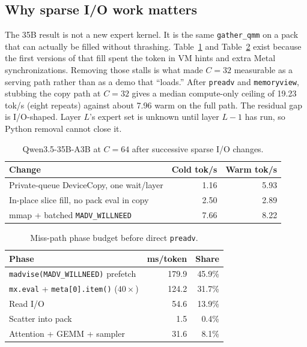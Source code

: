\documentclass[11pt]{article}
\theoremstyle{definition}
\begin{document}
\subsection{Why sparse I/O work matters}
\label{sec:eval-io}

The 35B result is not a new expert kernel. It is the same \texttt{gather\_qmm} on a pack that can actually be filled without thrashing. Table~\ref{tab:io} and Table~\ref{tab:phase} exist because the first versions of that fill spent the token in VM hints and extra Metal synchronizations. Removing those stalls is what made $C{=}32$ measurable as a serving path rather than as a demo that ``loads.'' After \texttt{preadv} and \texttt{memoryview}, stubbing the copy path at $C{=}32$ gives a median compute-only ceiling of 19.23 tok/s (eight repeats) against about 7.96 warm on the full path. The residual gap is I/O-shaped. Layer $L$’s expert set is unknown until layer $L{-}1$ has run, so Python removal cannot close it.

\begin{table}[t]
\centering
\caption{Qwen3.5-35B-A3B at $C{=}64$ after successive sparse I/O changes.}
\label{tab:io}
\small
\begin{tabular}{@{}lrr@{}}
\toprule
Change & Cold tok/s & Warm tok/s \\
\midrule
Private-queue DeviceCopy, one wait/layer & 1.16 & 5.93 \\
In-place slice fill, no pack eval in copy & 2.50 & 2.89 \\
mmap + batched \texttt{MADV\_WILLNEED} & 7.66 & 8.22 \\
\bottomrule
\end{tabular}
\end{table}

\begin{table}[t]
\centering
\caption{Miss-path phase budget before direct \texttt{preadv}.}
\label{tab:phase}
\small
\begin{tabular}{@{}lrr@{}}
\toprule
Phase & ms/token & Share \\
\midrule
\texttt{madvise(MADV\_WILLNEED)} prefetch & 179.9 & 45.9\% \\
\texttt{mx.eval} + \texttt{meta[0].item()} ($40{\times}$) & 124.2 & 31.7\% \\
Read I/O & 54.6 & 13.9\% \\
Scatter into pack & 1.5 & 0.4\% \\
Attention + GEMM + sampler & 31.6 & 8.1\% \\
\bottomrule
\end{tabular}
\end{table}
\end{document}
